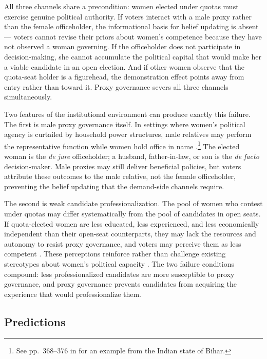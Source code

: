\documentclass[12pt]{article}
\begin{document}
All three channels share a precondition: women elected under quotas must exercise genuine political authority. If voters interact with a male proxy rather than the female officeholder, the informational basis for belief updating is absent --- voters cannot revise their priors about women's competence because they have not observed a woman governing. If the officeholder does not participate in decision-making, she cannot accumulate the political capital that would make her a viable candidate in an open election. And if other women observe that the quota-seat holder is a figurehead, the demonstration effect points away from entry rather than toward it. Proxy governance severs all three channels simultaneously.

Two features of the institutional environment can produce exactly this failure. The first is male proxy governance itself. In settings where women's political agency is curtailed by household power structures, male relatives may perform the representative function while women hold office in name \citep{tate2004black, dahlerup2008gender, valdini2019inclusion, meguid2025strategic}.\footnote{See pp.~368--376 in \citealt{thakur2015brothers} for an example from the Indian state of Bihar.} The elected woman is the \textit{de jure} officeholder; a husband, father-in-law, or son is the \textit{de facto} decision-maker. Male proxies may still deliver beneficial policies, but voters attribute these outcomes to the male relative, not the female officeholder, preventing the belief updating that the demand-side channels require.

The second is weak candidate professionalization. The pool of women who contest under quotas may differ systematically from the pool of candidates in open seats. If quota-elected women are less educated, less experienced, and less economically independent than their open-seat counterparts, they may lack the resources and autonomy to resist proxy governance, and voters may perceive them as less competent \citep{weeks2015quotas, allen2016measuring}. These perceptions reinforce rather than challenge existing stereotypes about women's political capacity \citep{hansen1997talking, atkeson2003not}. The two failure conditions compound: less professionalized candidates are more susceptible to proxy governance, and proxy governance prevents candidates from acquiring the experience that would professionalize them.

\subsection{Predictions}\label{subsec:predictions}
\end{document}

